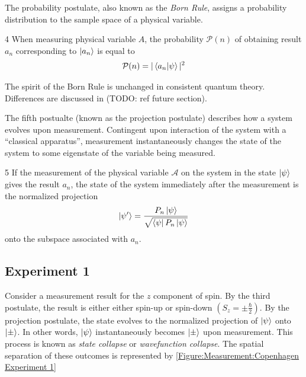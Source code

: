 The probability postulate, also known as the \textit{Born Rule}, assigns a probability distribution to the sample space of a physical variable.

\begin{Thm:Postulate}{4}
    When measuring physical variable $A$, the probability $\mathcal{P}(n)$ of obtaining result $a_n$ corresponding to $\ket{a_n}$  is equal to
     \begin{align}
        \mathcal{P}(n) = |\braket{a_n|\psi}|^2
    \end{align}
\end{Thm:Postulate}

The spirit of the Born Rule is unchanged in consistent quantum theory. Differences are discussed in (TODO: ref future section).


The fifth postualte (known as the projection postulate) describes how a system evolves upon measurement. Contingent upon interaction of the system with a ``classical apparatus'', measurement instantaneously changes the state of the system to some eigenstate of the variable being measured.

\begin{Thm:Postulate}{5} \label{projection postulate}
    If the measurement of the physical variable $\mathcal{A}$ on the system in the state $\ket{\psi}$ gives the result $a_n$, the state of the system immediately after the measurement is the normalized projection
    \begin{align}
        \ket{\psi^\prime} = \frac{P_n\ket{\psi}}{\sqrt{\bra{\psi}P_n\ket{\psi}
        }}
    \end{align}
    onto the subspace associated with $a_n$.
\end{Thm:Postulate}

\subsection{Experiment 1}

Consider a measurement result for the $z$ component of spin. By the third postulate, the result is either either spin-up or spin-down $\left( S_z = \pm \frac{\hbar}{2} \right)$. By the projection postulate, the state evolves to the normalized projection of $\ket{\psi}$ onto $\ket{\pm}$. In other words, $\ket{\psi}$ instantaneously becomes $\ket{\pm}$ upon measurement. This process is known as \textit{state collapse} or \textit{wavefunction collapse}. The spatial separation of these outcomes is represented by \autoref{Figure:Measurement:Copenhagen Experiment 1}

